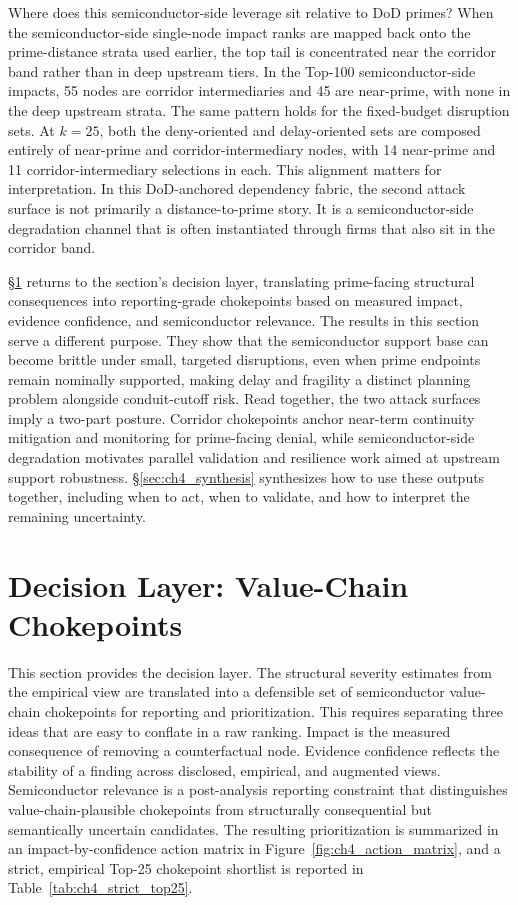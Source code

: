 Where does this semiconductor-side leverage sit relative to DoD primes? When the semiconductor-side single-node impact ranks are mapped back onto the prime-distance strata used earlier, the top tail is concentrated near the corridor band rather than in deep upstream tiers. In the Top-100 semiconductor-side impacts, 55 nodes are corridor intermediaries and 45 are near-prime, with none in the deep upstream strata. The same pattern holds for the fixed-budget disruption sets. At $k=25$, both the deny-oriented and delay-oriented sets are composed entirely of near-prime and corridor-intermediary nodes, with 14 near-prime and 11 corridor-intermediary selections in each. This alignment matters for interpretation. In this DoD-anchored dependency fabric, the second attack surface is not primarily a distance-to-prime story. It is a semiconductor-side degradation channel that is often instantiated through firms that also sit in the corridor band.

\S\ref{sec:ch4_decision} returns to the section's decision layer, translating prime-facing structural consequences into reporting-grade chokepoints based on measured impact, evidence confidence, and semiconductor relevance. The results in this section serve a different purpose. They show that the semiconductor support base can become brittle under small, targeted disruptions, even when prime endpoints remain nominally supported, making delay and fragility a distinct planning problem alongside conduit-cutoff risk. Read together, the two attack surfaces imply a two-part posture. Corridor chokepoints anchor near-term continuity mitigation and monitoring for prime-facing denial, while semiconductor-side degradation motivates parallel validation and resilience work aimed at upstream support robustness. \S\ref{sec:ch4_synthesis} synthesizes how to use these outputs together, including when to act, when to validate, and how to interpret the remaining uncertainty.

\section{Decision Layer: Value-Chain Chokepoints}
\label{sec:ch4_decision}

This section provides the decision layer. The structural severity estimates from the empirical view are translated into a defensible set of semiconductor value-chain chokepoints for reporting and prioritization. This requires separating three ideas that are easy to conflate in a raw ranking. Impact is the measured consequence of removing a counterfactual node. Evidence confidence reflects the stability of a finding across disclosed, empirical, and augmented views. Semiconductor relevance is a post-analysis reporting constraint that distinguishes value-chain-plausible chokepoints from structurally consequential but semantically uncertain candidates. The resulting prioritization is summarized in an impact-by-confidence action matrix in Figure~\ref{fig:ch4_action_matrix}, and a strict, empirical Top-25 chokepoint shortlist is reported in Table~\ref{tab:ch4_strict_top25}.

